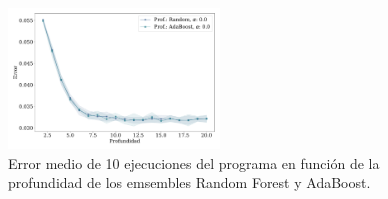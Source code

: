 \begin{figure}[H]
	\begin{small}
		\begin{center}
			\includegraphics[width=0.5\textwidth]{figures/err_prof_item_gh.pdf}
		\end{center}
		\caption{Error medio de 10 ejecuciones del programa en función de la profundidad de los emsembles Random Forest y AdaBoost.}
		\label{fig:params_prof}
	\end{small}
\end{figure}

